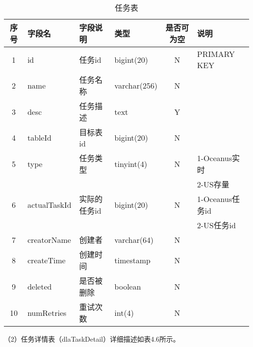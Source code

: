 \begin{table}[h]
  \centering
  \caption{任务表}
  \label{tab:exampletable}
  \begin{tabular}{clllcl}
    \toprule
    序号  & 字段名         & 字段说明     & 类型           & 是否可为空   & 说明  \\
    \midrule
    1    & id            & 任务id      & bigint(20)     & N          & PRIMARY KEY    \\
    2    & name          & 任务名称     & varchar(256)   & N          &     \\
    3    & desc          & 任务描述     & text           & Y          &   \\
    4    & tableId       & 目标表id     & bigint(20)     & N          &   \\
    5    & type          & 任务类型     & tinyint(4)     & N          & 1-Oceanus实时  \\
         &               &             &               &             & 2-US存量  \\
    6    & actualTaskId  & 实际的任务id  & bigint(20)    & N          &  1-Oceanus任务id  \\
         &               &             &               &             & 2-US任务id  \\
    7    & creatorName   & 创建者       & varchar(64)    & N          &   \\
    8    & createTime    & 创建时间     & timestamp      & N          &   \\
    9    & deleted       & 是否被删除    & boolean        & N          &   \\
    10   & numRetries    & 重试次数      & int(4)        & N          &   \\
    \bottomrule
  \end{tabular}
\end{table}

（2）任务详情表（dlaTaskDetail）详细描述如表4.6所示。

